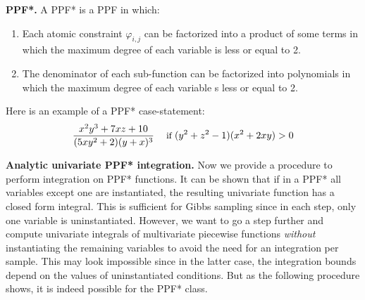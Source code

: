 \documentclass[letterpaper]{article}
\renewcommand{\vec}[1]{\mathbf{#1}}
\newcommand{\singlecase}[2]{#2 \quad \text{ if } #1}
\begin{document}
\textbf{PPF*. }
A PPF* is a PPF in which: %
\vspace{-2mm}
\begin{enumerate}[leftmargin=2.6ex]
\item Each atomic constraint $\varphi_{i,j}$
can be factorized into a product of some terms in which the maximum degree of each variable is less or equal to 2. 
\item The denominator of each sub-function can be factorized into %
polynomials in which the maximum degree of each variable s less or equal to 2.
\end{enumerate}
\vspace{-2mm}
Here is an example of a PPF* case-statement:
{\footnotesize
\begin{equation}\vspace{-0.5mm}
{\footnotesize
\label{e:ppf*example}
\singlecase{(y^2+z^2 -1)(x^2+2xy) > 0}
{\frac{x^2 y^3 + 7xz + 10}{(5xy^2 + 2)(y + x)^3}}
}
\end{equation}
}


{\bf Analytic univariate PPF* integration.} 
Now we provide a procedure to perform integration on PPF* functions.
It can be shown that if in a PPF* all variables except one are instantiated, 
the resulting univariate function has a closed form integral.  
This is sufficient for Gibbs sampling since in each step, only one variable is uninstantiated.
However, we want to go a step further and compute univariate integrals of multivariate piecewise functions  
\emph{without} instantiating the remaining variables to avoid the need
for an integration per sample.
This may look impossible since in the latter case, the integration bounds depend on the values of uninstantiated conditions. 
But as the following procedure shows, it is indeed possible for the PPF* class.
\end{document}
